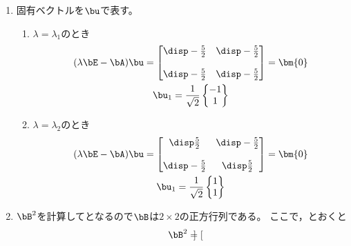 \begin{ans*}
  ${}$
  \begin{enumerate}[label=(\arabic*)]
    \item 固有ベクトルを$\bu$で表す。
    
    \begin{enumerate}[label=(\roman*)]
      \item $\lambda = \lambda_1$のとき
      \begin{gather}
        (\lambda \bE - \bA)\bu
        =
        \begin{bmatrix}
          {\disp -\frac{5}{2}} & {\disp -\frac{5}{2}} \\
          \\
          {\disp -\frac{5}{2}} & {\disp -\frac{5}{2}} \\
        \end{bmatrix}
        = \bm{0} \\
        \bu_1 = 
        \frac{1}{\sqrt{2}}
        \begin{Bmatrix}
          -1 \\ 1
        \end{Bmatrix}
      \end{gather}
      \item $\lambda = \lambda_2$のとき
      \begin{gather}
        (\lambda \bE - \bA)\bu
        =
        \begin{bmatrix}
          {\disp \frac{5}{2}} & {\disp -\frac{5}{2}} \\
          \\
          {\disp -\frac{5}{2}} & {\disp \frac{5}{2}} \\
        \end{bmatrix}
        = \bm{0} \\
        \bu_1 = 
        \frac{1}{\sqrt{2}}
        \begin{Bmatrix}
          1 \\ 1
        \end{Bmatrix}
      \end{gather}
    \end{enumerate}
    \item $\bB^2$を計算して\bA となるので$\bB$は$2\times2$の正方行列である。
    ここで，とおくと
    \begin{gather}
      \bB^2 =
      \begin{bmatrix}

\end{bmatrix}
\end{gather}
\end{enumerate}
\end{ans*}
